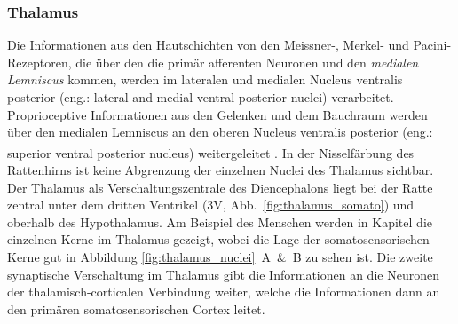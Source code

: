 \documentclass[12pt,a4paper,pdftex]{article}
\begin{document}
\subsubsection*{Thalamus}
Die Informationen aus den Hautschichten von den Meissner-, Merkel- und Pacini-Rezeptoren, die über den die primär afferenten Neuronen und den \textit{medialen Lemniscus} kommen, werden im lateralen und medialen Nucleus ventralis posterior (eng.: lateral and medial
ventral posterior nuclei) verarbeitet. Proprioceptive Informationen aus den Gelenken und dem Bauchraum werden über den medialen Lemniscus an den oberen Nucleus ventralis posterior (eng.: superior ventral posterior nucleus) weitergeleitet \textsuperscript{\cite[22]{kandel2013principles}}. 
In der Nisselfärbung des Rattenhirns ist keine Abgrenzung der einzelnen Nuclei des Thalamus sichtbar. Der Thalamus als Verschaltungszentrale des Diencephalons liegt bei der Ratte zentral unter dem dritten Ventrikel (3V, Abb.~\ref{fig:thalamus_somato}) und oberhalb des Hypothalamus. 
Am Beispiel des Menschen werden in Kapitel \label{subsubsec:thalamus} die einzelnen Kerne im Thalamus gezeigt, wobei die Lage der somatosensorischen Kerne gut in Abbildung \ref{fig:thalamus_nuclei}~A~\&~B zu sehen ist.
Die zweite synaptische Verschaltung im Thalamus gibt die Informationen an die Neuronen der thalamisch-corticalen Verbindung weiter, welche die Informationen dann an den primären somatosensorischen Cortex leitet.
\end{document}
